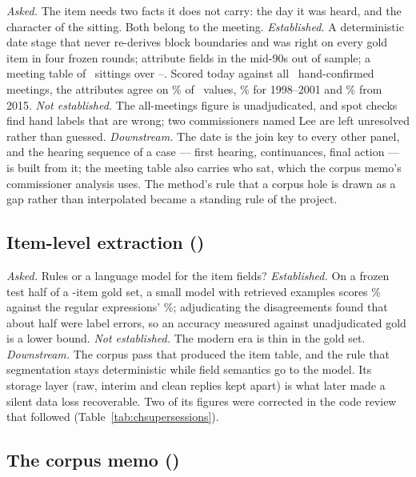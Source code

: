 \documentclass[11pt]{article}
\begin{document}
\textit{Asked.} The item needs two facts it does not carry: the day it was heard, and the
character of the sitting. Both belong to the meeting. \textit{Established.} A deterministic date
stage that never re-derives block boundaries and was right on every gold item in four frozen
rounds; attribute fields in the mid-90s out of sample; a meeting table of \chMeetings\ sittings
over \chMeetFirst--\chMeetLast. Scored today against all \chMeetScored\ hand-confirmed meetings,
the attributes agree on \chMeetAcc\% of \chMeetValues\ values, \chMeetEarly\% for 1998--2001 and
\chMeetLate\% from 2015. \textit{Not established.} The all-meetings figure is unadjudicated, and
spot checks find hand labels that are wrong; two commissioners named Lee are left unresolved
rather than guessed. \textit{Downstream.} The date is the join key to every other panel, and the hearing sequence
of a case --- first hearing, continuances, final action --- is built from it; the meeting table
also carries who sat, which the corpus memo's commissioner analysis uses. The method's rule that
a corpus hole is drawn as a gap rather than interpolated became a standing rule of the project.

\subsection{Item-level extraction (\chDateExtractionMethodComparison)}\label{sec:chextractionmethodcomparison}

\textit{Asked.} Rules or a language model for the item fields? \textit{Established.} On a frozen
test half of a \chGoldItems-item gold set, a small model with retrieved examples scores
\chHaikuTest\% against the regular expressions' \chRegexTest\%; adjudicating the disagreements
found that about half were label errors, so an accuracy measured against unadjudicated gold is a
lower bound. \textit{Not established.} The modern era is thin in the gold set.
\textit{Downstream.} The corpus pass that produced the item table, and the rule that segmentation
stays deterministic while field semantics go to the model. Its storage layer (raw, interim and
clean replies kept apart) is what later made a silent data loss recoverable. Two of its figures
were corrected in the code review that followed (Table~\ref{tab:chsupersessions}).

\subsection{The corpus memo (\chDateDiscretionaryReviewPatterns)}\label{sec:chdiscretionaryreviewpatterns}
\end{document}
